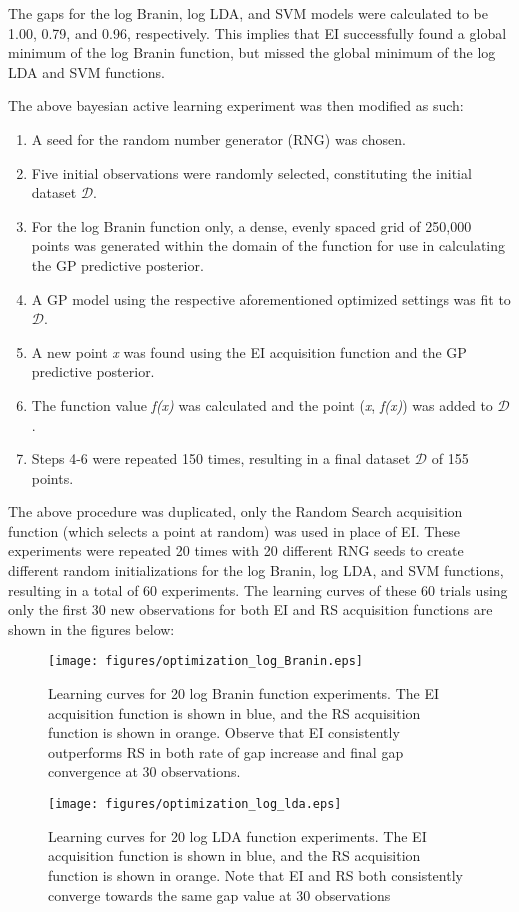 \documentclass[11pt]{article}
\numberwithin{equation}{section}
\begin{document}
The gaps for the log Branin, log LDA, and SVM models were calculated to be 1.00, 0.79, and 0.96, respectively. 
This implies that EI successfully found a global minimum of the log Branin function, but missed the global minimum of the log LDA and SVM functions.

The above bayesian active learning experiment was then modified as such:
\begin{enumerate}
  \item A seed for the random number generator (RNG) was chosen.
  \item Five initial observations were randomly selected, constituting the initial dataset $\mathcal{D}$.
  \item For the log Branin function only, a dense, evenly spaced grid of 250,000 points was generated within the domain of the function for use in calculating the GP predictive posterior.
  \item A GP model using the respective aforementioned optimized settings was fit to $\mathcal{D}$.
  \item A new point \emph{x} was found using the EI acquisition function and the GP predictive posterior.
  \item The function value \emph{f(x)} was calculated and the point (\emph{x}, \emph{f(x)}) was added to $\mathcal{D}$.
  \item Steps 4-6 were repeated 150 times, resulting in a final dataset $\mathcal{D}$ of 155 points.
\end{enumerate}
The above procedure was duplicated, only the Random Search acquisition function (which selects a point at random) was used in place of EI.
These experiments were repeated 20 times with 20 different RNG seeds to create different random initializations for the log Branin, log LDA, and SVM functions, resulting in a total of 60 experiments. 
The learning curves of these 60 trials using only the first 30 new observations for both EI and RS acquisition functions are shown in the figures below:
\begin{figure}[H]
  \centering
  \texttt{[image: figures/optimization\_log\_Branin.eps]}
  \caption{Learning curves for 20 log Branin function experiments. The EI acquisition function is shown in blue, and the RS acquisition function is shown in orange. Observe that EI consistently outperforms RS in both rate of gap increase and final gap convergence at 30 observations.}
  \label{fig:ei-v-rand-branin}
\end{figure}
\begin{figure}[H]
  \centering
  \texttt{[image: figures/optimization\_log\_lda.eps]}
  \caption{Learning curves for 20 log LDA function experiments. The EI acquisition function is shown in blue, and the RS acquisition function is shown in orange. Note that EI and RS both consistently converge towards the same gap value at 30 observations}
  \label{fig:ei-v-rand-lda}
\end{figure}
\end{document}
